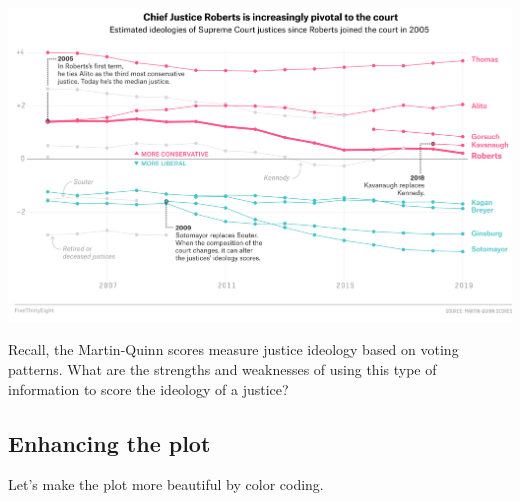 \documentclass[
  letterpaper,
  DIV=11,
  numbers=noendperiod]{scrreprt}
\begin{document}
\includegraphics{images/sccourt.png}

Recall, the Martin-Quinn scores measure justice ideology based on voting
patterns. What are the strengths and weaknesses of using this type of
information to score the ideology of a justice?

\hypertarget{enhancing-the-plot}{%
\subsection{Enhancing the plot}\label{enhancing-the-plot}}

Let's make the plot more beautiful by color coding.
\end{document}
